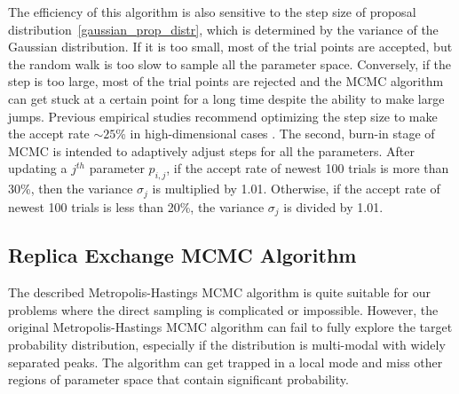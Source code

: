 \documentclass[preprint2]{aastex}
\begin{document}
The efficiency of this algorithm is also sensitive to the step size of proposal distribution~\eqref{gaussian_prop_distr}, which is determined by the variance of the Gaussian distribution. If it is too small, most of the trial points are accepted, but the random walk is too slow to sample all the parameter space. Conversely, if the step is too large, most of the trial points are rejected and the MCMC algorithm can get stuck at a certain point for a long time despite the ability to make large jumps. Previous empirical studies recommend optimizing the step size to make the accept rate $\sim 25$\% in high-dimensional cases \citep[see references in][]{Gregory2005}. The second, burn-in stage of MCMC is intended to adaptively adjust steps for all the parameters. After updating a $j^{th}$ parameter $p_{i,j}$, if the accept rate of newest 100 trials is more than 30\%, then the variance $\sigma_j$ is multiplied by 1.01. Otherwise, if the accept rate of newest 100 trials is less than 20\%, the variance $\sigma_j$ is divided by 1.01. 



\subsection{Replica Exchange MCMC Algorithm}

The described Metropolis-Hastings MCMC algorithm is quite suitable for our problems where the direct sampling is complicated or impossible. However, the original Metropolis-Hastings MCMC algorithm can fail to fully explore the target probability distribution, especially if the distribution is multi-modal with widely separated peaks. The algorithm can get trapped in a local mode and miss other regions of parameter space that contain significant probability. 
\end{document}

